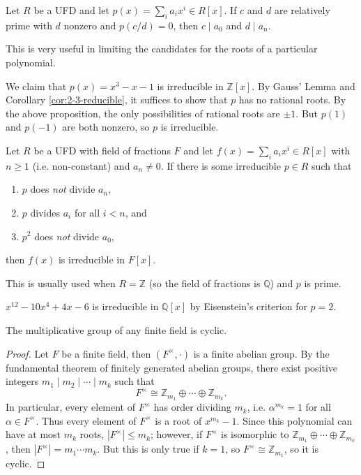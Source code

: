 \documentclass[10pt]{report}
\begin{document}
\begin{prop}
	Let $R$ be a UFD and let $p(x) = \sum_i a_i x^i \in R[x]$. If $c$ and $d$ are relatively prime with $d$ nonzero and $p(c/d) = 0$, then $c \;|\; a_0$ and $d \;|\; a_n$.
\end{prop}

This is very useful in limiting the candidates for the roots of a particular polynomial.

\begin{ex}[]
	We claim that $p(x) = x^3-x-1$ is irreducible in $\mathbb{Z}[x]$. By Gauss' Lemma and Corollary \ref{cor:2-3-reducible}, it suffices to show that $p$ has no rational roots. By the above proposition, the only possibilities of rational roots are $\pm 1$. But $p(1)$ and $p(-1)$ are both nonzero, so $p$ is irreducible.
\end{ex}

\begin{thrm}
	Let $R$ be a UFD with field of fractions $F$ and let $f(x) = \sum_i a_i x^i \in R[x]$ with $n \geq 1$ (i.e. non-constant) and $a_n \neq 0$. If there is some irreducible $p \in R$ such that
	\begin{enumerate}
		\item $p$ does \textit{not} divide $a_n$,
		\item $p$ divides $a_i$ for all $i < n$, and
		\item $p^2$ does \textit{not} divide $a_0$,
	\end{enumerate}
	then $f(x)$ is irreducible in $F[x]$.
\end{thrm}

This is usually used when $R=\mathbb{Z}$ (so the field of fractions is $\mathbb{Q}$) and $p$ is prime.

\begin{ex}[]
	$x^{12}-10x^{4}+4x-6$ is irreducible in $\mathbb{Q}[x]$ by Eisenstein's criterion for $p=2$.
\end{ex}

\begin{thrm}[]
	The multiplicative group of any finite field is cyclic.
\end{thrm}
\begin{proof}
	Let $F$ be a finite field, then $(F^\times, \cdot)$ is a finite abelian group. By the fundamental theorem of finitely generated abelian groups, there exist positive integers $m_1 \;|\; m_2 \;|\; \cdots \;|\; m_k$ such that
	\[
	F^{\times} \cong \mathbb{Z}_{m_1} \oplus \cdots \oplus \mathbb{Z}_{m_k}.
	\] In particular, every element of $F^{\times}$ has order dividing $m_k$, i.e. $\alpha^{m_k} = 1$ for all $\alpha\in F^{\times}$. Thus every element of $F^{\times}$ is a root of $x^{m_k}-1$. Since this polynomial can have at most $m_k$ roots, $|F^{\times}| \leq m_{k}$; however, if $F^{\times}$ is isomorphic to $\mathbb{Z}_{m_1} \oplus \cdots \oplus \mathbb{Z}_{m_k}$, then $|F^{\times}| = m_1 \cdots m_k$. But this is only true if $k=1$, so $F^{\times}\cong \mathbb{Z}_{m_1}$, so it is cyclic.
\end{proof}
\end{document}

